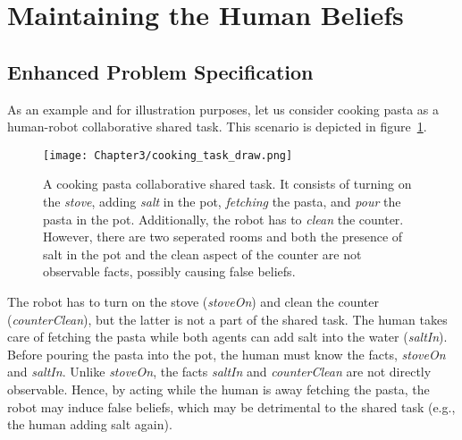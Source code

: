\section{Maintaining the Human Beliefs}

    \subsection{Enhanced Problem Specification}

As an example and for illustration purposes, let us consider cooking pasta as a human-robot collaborative shared task. This scenario is depicted in figure~\ref{fig:cooking_task}.

\begin{figure}[h]
    \centering
    \texttt{[image: Chapter3/cooking\_task\_draw.png]}
    \caption{
        A cooking pasta collaborative shared task. It consists of turning on the \textit{stove}, adding \textit{salt} in the pot, \textit{fetching} the pasta, and \textit{pour} the pasta in the pot. Additionally, the robot has to \textit{clean} the counter. However, there are two seperated rooms and both the presence of salt in the pot and the clean aspect of the counter are not observable facts, possibly causing false beliefs.
    }
    \label{fig:cooking_task}
\end{figure}

The robot has to turn on the stove (\textit{stoveOn}) and clean the counter (\textit{counterClean}), but the latter is not a part of the shared task. The human takes care of fetching the pasta while both agents can add salt into the water (\textit{saltIn}). Before pouring the pasta into the pot, the human must know the facts, \textit{stoveOn} and \textit{saltIn}. 
Unlike \textit{stoveOn}, the facts \textit{saltIn} and \textit{counterClean} are not directly observable. 
Hence, by acting while the human is away fetching the pasta, the robot may induce false beliefs, which may be detrimental to the shared task (e.g., the human adding salt again).

